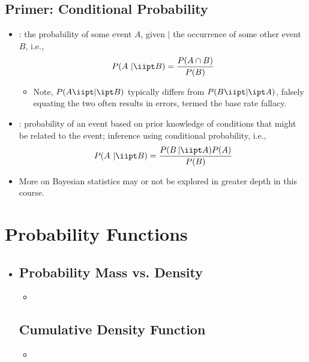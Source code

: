 \begin{itemize}
\begin{itemize}
  \end{itemize}
  
  \subsection{Primer: Conditional Probability}
  \begin{itemize}
    \item {}: the probability of some event \(A\), given \(|\) the occurrence of some other event \(B\), i.e.,
    \[%
    P(A~|\iipt B)=\frac{P(A\cap B)}{P(B)}
    \]%
    \begin{itemize}
      \item Note, \(P(A\iipt | \ipt B)\) typically differs from \(P(B \iipt | \ipt A)\), falsely equating the two often results in errors, termed the base rate fallacy.
    \end{itemize}
    \item {}: probability of an event based on prior knowledge of conditions that might be related to the event; inference using conditional probability, i.e.,
    \[%
    P(A~|\iipt B)=\frac{P(B\,|\iipt A)P(A)}{P(B)}
    \]%
    \item More on Bayesian statistics may or not be explored in greater depth in this course.
  \end{itemize}
  
\end{itemize}

\section{Probability Functions}
\begin{itemize}
  \item []
  
  \subsection{Probability Mass vs. Density}
  \begin{itemize}
    \item 
  \end{itemize}

  \subsection{Cumulative Density Function}
  \begin{itemize}
    \item 
  \end{itemize}
  
\end{itemize}

